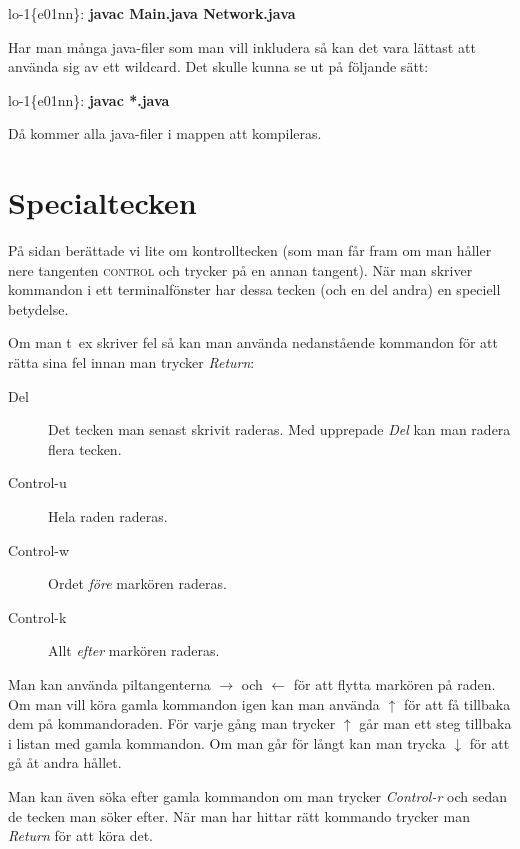 \documentclass[a4paper,twocolumn]{book}
\begin{document}
\begin{example}
lo-1\{e01nn\}: \textbf{javac Main.java Network.java}
\end{example}

Har man många java-filer som man vill inkludera så kan det vara lättast att
använda sig av ett wildcard. Det skulle kunna se ut på följande sätt:
\begin{example}
lo-1\{e01nn\}: \textbf{javac *.java}
\end{example}
Då kommer alla java-filer i mappen att kompileras.


\section{Specialtecken}

På sidan \pageref{control} berättade vi lite om
kontrolltecken (som man får fram om man håller nere tangenten
\textsc{control} och trycker på en annan tangent). När man skriver
kommandon i ett terminalfönster har dessa tecken (och en del andra) en
speciell betydelse.

Om man t~ex skriver fel så kan man använda nedanstående kommandon för
att rätta sina fel innan man trycker \emph{Return}:
\begin{description}
\item[Del] Det tecken man senast skrivit raderas. Med upprepade
  \emph{Del} kan man radera flera tecken.
\item[Control-u] Hela raden raderas.
\item[Control-w] Ordet \emph{före} markören raderas.
\item[Control-k] Allt \emph{efter} markören raderas.
\end{description}
Man kan använda piltangenterna $\rightarrow$ och $\leftarrow$ för att
flytta markören på raden. Om man vill köra gamla kommandon igen kan
man använda $\uparrow$ för att få tillbaka dem på kommandoraden. För
varje gång man trycker $\uparrow$ går man ett steg tillbaka i listan
med gamla kommandon. Om man går för långt kan man trycka $\downarrow$
för att gå åt andra hållet.

Man kan även söka efter gamla kommandon om man trycker \emph{Control-r} och
sedan de tecken man söker efter. När man har hittar rätt kommando trycker man
\emph{Return} för att köra det.
\end{document}
